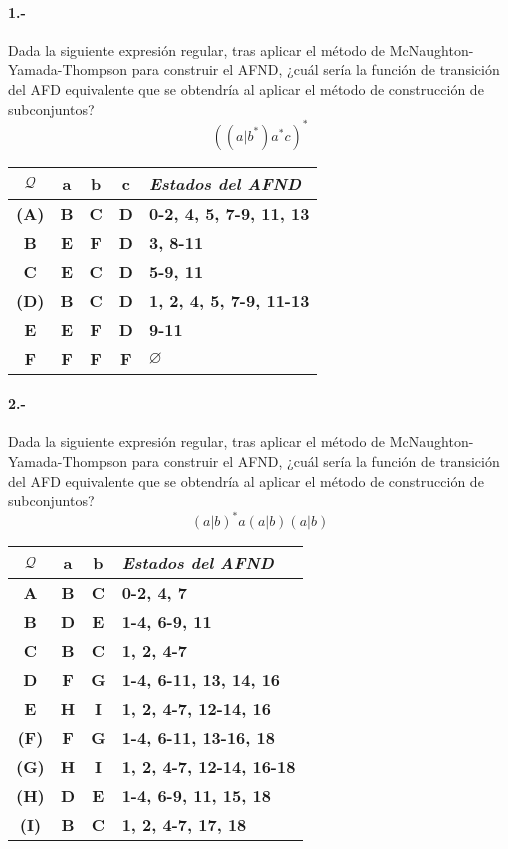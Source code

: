 \documentclass[11pt,a4paper,table,answers]{exam} %
\newcommand{\h}[1]{\ifprintanswers\textcolor{azul}{\bf#1}\else{\phantom{\bf#1}}\fi}
\newlength{\graphicheigth}
\newcommand{\myincludegraphicssol}[1]{%
    \sbox{\graphicbox}{%
        \begin{adjustbox}{max size={\textwidth}{\textheight}}
            \texttt{[image: \#1]}
        \end{adjustbox}
    }
    \settoheight{\graphicheigth}{\usebox{\graphicbox}}
    \addtolength{\graphicheigth}{4ex} %
    \ifprintanswers
        \begin{center}
            \usebox{\graphicbox}
        \end{center} 
    \else
        \makeemptybox{\graphicheigth}
    \fi
}
\begin{document}
\paragraph{1.-}\label{p1}
Dada la siguiente expresión regular, tras aplicar el método de McNaughton-Yamada-Thompson para construir el AFND, ¿cuál sería la función de transición del AFD equivalente que se obtendría al aplicar el método de construcción de subconjuntos?
\[
    ((a|b^*)a^*c)^*
\]
\myincludegraphicssol{}
\begin{tabular} {c@{\hspace{4mm}}ccc@{\hspace{4mm}}l}
\toprule %
$\mathcal{Q}$ & a & b & c & \emph{Estados del AFND}\\
\midrule %
\h{(A)} & \h{B} & \h{C} & \h{D} & \h{0-2, 4, 5, 7-9, 11, 13}\\
\h{B} & \h{E} & \h{F} & \h{D} & \h{3, 8-11}\\
\h{C} & \h{E} & \h{C} & \h{D} & \h{5-9, 11}\\
\h{(D)} & \h{B} & \h{C} & \h{D} & \h{1, 2, 4, 5, 7-9, 11-13}\\
\h{E} & \h{E} & \h{F} & \h{D} & \h{9-11}\\
\h{F} & \h{F} & \h{F} & \h{F} & \h{$\varnothing$}\\
\bottomrule %
\end{tabular}

\paragraph{2.-}\label{p2}
Dada la siguiente expresión regular, tras aplicar el método de McNaughton-Yamada-Thompson para construir el AFND, ¿cuál sería la función de transición del AFD equivalente que se obtendría al aplicar el método de construcción de subconjuntos?
\[
    (a|b)^*a(a|b)(a|b)
\]
\myincludegraphicssol{}
\begin{tabular} {c@{\hspace{4mm}}cc@{\hspace{4mm}}l}
\toprule %
$\mathcal{Q}$ & a & b & \emph{Estados del AFND}\\
\midrule %
\h{A} & \h{B} & \h{C} & \h{0-2, 4, 7}\\
\h{B} & \h{D} & \h{E} & \h{1-4, 6-9, 11}\\
\h{C} & \h{B} & \h{C} & \h{1, 2, 4-7}\\
\h{D} & \h{F} & \h{G} & \h{1-4, 6-11, 13, 14, 16}\\
\h{E} & \h{H} & \h{I} & \h{1, 2, 4-7, 12-14, 16}\\
\h{(F)} & \h{F} & \h{G} & \h{1-4, 6-11, 13-16, 18}\\
\h{(G)} & \h{H} & \h{I} & \h{1, 2, 4-7, 12-14, 16-18}\\
\h{(H)} & \h{D} & \h{E} & \h{1-4, 6-9, 11, 15, 18}\\
\h{(I)} & \h{B} & \h{C} & \h{1, 2, 4-7, 17, 18}\\
\bottomrule %
\end{tabular}
\end{document}
